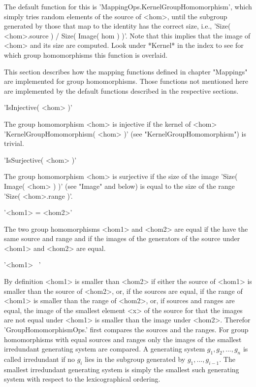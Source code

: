 The default  function for  this  is 'MappingOps.KernelGroupHomomorphism',
which  simply tries random elements  of the  source of  <hom>,  until the
subgroup  generated  by those that map  to  the identity has the  correct
size,  i.e.,  'Size( <hom>.source ) / Size(  Image( hom )  )'.  Note that
this implies  that the  image  of <hom> and  its size are computed.  Look
under *Kernel* in the  index to see for  which  group  homomorphisms this
function is overlaid.


This  section describes  how the  mapping functions  defined  in  chapter
"Mappings" are implemented  for group homomorphisms.  Those functions not
mentioned here  are implemented by the default functions described in the
respective sections.

\vspace{5mm}
'IsInjective( <hom> )'%

The  group   homomorphism <hom>  is injective  if  the  kernel  of  <hom>
'KernelGroupHomomorphism( <hom>   )' (see  "KernelGroupHomomorphism")  is
trivial.

\vspace{5mm}
'IsSurjective( <hom> )'%

The group homomorphism  <hom> is  surjective  if the size  of  the  image
'Size( Image( <hom> ) )'  (see "Image" and below) is equal to the size of
the range 'Size( <hom>.range )'.

\vspace{5mm}
'<hom1> = <hom2>'%

The two group  homomorphisms <hom1>  and <hom2> are equal if the have the
same source and range and if the images  of the generators of  the source
under <hom1> and <hom2> are equal.

\vspace{5mm}
'<hom1> \<\ <hom2>'%

By definition <hom1> is smaller  than  <hom2> if  either  the  source  of
<hom1> is  smaller  than  the source of <hom2>,  or, if  the sources  are
equal, if the range of <hom1> is smaller than the range of <hom2>, or, if
sources and ranges are  equal, the  image  of the smallest element <x> of
the source for that the images are not equal under <hom1> is smaller than
the  image  under   <hom2>.   Therefor   'GroupHomomorphismOps.\<'  first
compares the sources and the  ranges.  For group homomorphisms with equal
sources and ranges only the images of the smallest irredundant generating
system are compared.  A generating system $g_1, g_2, ..., g_n$ is  called
irredundant if no $g_i$ lies  in the subgroup  generated  by  $g_1,  ...,
g_{i-1}$.   The  smallest  irredundant generating  system  is simply  the
smallest  such generating system  with  respect  to  the  lexicographical
ordering.

